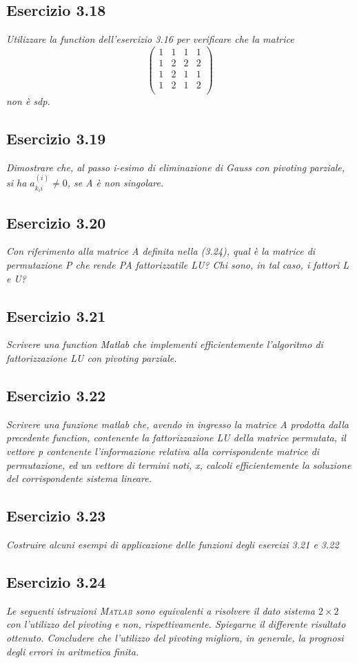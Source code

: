\subsection{Esercizio 3.18}
\emph{Utilizzare la function dell'esercizio 3.16 per verificare che la matrice}\\
   $$\begin{pmatrix}
      1 & 1 & 1 & 1 \\
      1 & 2 & 2 & 2 \\
      1 & 2 & 1 & 1 \\
      1 & 2 & 1 & 2 \\
   \end{pmatrix}$$
\emph{non è sdp.}
\subsection{Esercizio 3.19}
\emph{Dimostrare che, al passo i-esimo di eliminazione di Gauss con pivoting parziale, si ha $a_{k_{i}i}^{(i)} \neq 0 $, se A è non singolare.}
\subsection{Esercizio 3.20}
\emph{Con riferimento alla matrice A definita nella (3.24), qual è la matrice di permutazione P che rende PA fattorizzatile LU? Chi sono, in tal caso, i fattori L e U?}
\subsection{Esercizio 3.21}
\emph{Scrivere una function Matlab che implementi efficientemente l'algoritmo di fattorizzazione LU con pivoting parziale.}
\subsection{Esercizio 3.22}
\emph{Scrivere una funzione matlab che, avendo in ingresso la matrice A prodotta dalla precedente function, contenente la fattorizzazione LU della matrice permutata, il vettore p contenente l'informazione relativa alla corrispondente matrice di permutazione, ed un vettore di termini noti, x, calcoli efficientemente la soluzione del corrispondente sistema lineare.}
\subsection{Esercizio 3.23}
\emph{Costruire alcuni esempi di applicazione delle funzioni degli esercizi 3.21 e 3.22}
\subsection{Esercizio 3.24}
\emph{Le seguenti istruzioni \textsc{Matlab} sono equivalenti a risolvere il dato sistema $2\times 2$ con l'utilizzo del pivoting e non, rispettivamente. Spiegarne il differente risultato ottenuto. Concludere che l'utilizzo del pivoting migliora, in generale, la prognosi degli errori in aritmetica finita.}

